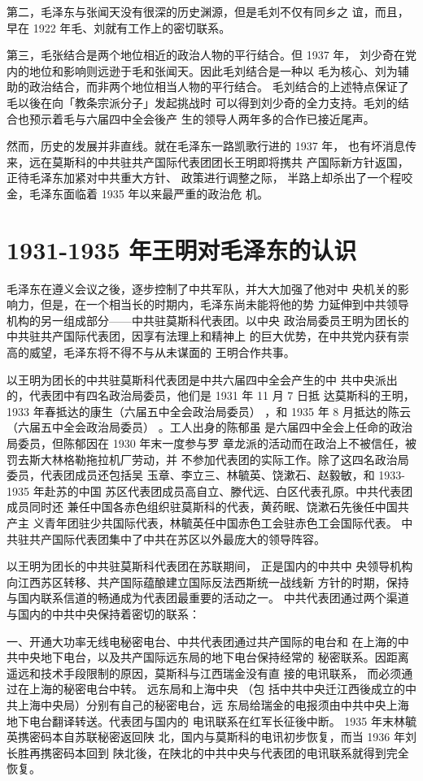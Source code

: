 第二，毛泽东与张闻天没有很深的历史渊源，但是毛刘不仅有同乡之
谊，而且，早在 1922 年毛、刘就有工作上的密切联系。

第三，毛张结合是两个地位相近的政治人物的平行结合。但 1937 年，
刘少奇在党内的地位和影响则远逊于毛和张闻天。因此毛刘结合是一种以
毛为核心、刘为辅助的政治结合，而非两个地位相当人物的平行结合。
毛刘结合的上述特点保证了毛以後在向「教条宗派分子」发起挑战时
可以得到刘少奇的全力支持。毛刘的结合也预示着毛与六届四中全会後产
生的领导人两年多的合作已接近尾声。

然而，历史的发展并非直线。就在毛泽东一路凯歌行进的 1937 年，
也有坏消息传来，远在莫斯科的中共驻共产国际代表团团长王明即将携共
产国际新方针返国，
正待毛泽东加紧对中共重大方针、
政策进行调整之际，
半路上却杀出了一个程咬金，毛泽东面临着 1935 年以来最严重的政治危
机。

\section{1931-1935 年王明对毛泽东的认识}
毛泽东在遵义会议之後，逐步控制了中共军队，并大大加强了他对中
央机关的影响力，但是，在一个相当长的时期内，毛泽东尚未能将他的势
力延伸到中共领导机构的另一组成部分——中共驻莫斯科代表团。以中央
政治局委员王明为团长的中共驻共产国际代表团，因享有法理上和精神上
的巨大优势，在中共党内获有崇高的威望，毛泽东将不得不与从未谋面的
王明合作共事。
 
以王明为团长的中共驻莫斯科代表团是中共六届四中全会产生的中
共中央派出的，代表团中有四名政治局委员，他们是 1931 年 11 月 7 日抵
达莫斯科的王明，1933 年春抵达的康生（六届五中全会政治局委员） ，和
1935 年 8 月抵达的陈云（六届五中全会政治局委员） 。工人出身的陈郁虽
是六届四中全会上任命的政治局委员，但陈郁因在 1930 年末一度参与罗
章龙派的活动而在政治上不被信任，被罚去斯大林格勒拖拉机厂劳动，并
不参加代表团的实际工作。除了这四名政治局委员，代表团成员还包括吴
玉章、李立三、林毓英、饶漱石、赵毅敏，和 1933-1935 年赴苏的中国
苏区代表团成员高自立、滕代远、白区代表孔原。中共代表团成员同时还
兼任中国各赤色组织驻莫斯科的代表，黄药眠、饶漱石先後任中国共产主
义青年团驻少共国际代表，林毓英任中国赤色工会驻赤色工会国际代表。
中共驻共产国际代表团集中了中共在苏区以外最庞大的领导阵容。

以王明为团长的中共驻莫斯科代表团在苏联期间，
正是国内的中共中
央领导机构向江西苏区转移、共产国际蕴酿建立国际反法西斯统一战线新
方针的时期，保持与国内联系信道的畅通成为代表团最重要的活动之一。
中共代表团通过两个渠道与国内的中共中央保持着密切的联系：

一、开通大功率无线电秘密电台、中共代表团通过共产国际的电台和
在上海的中共中央地下电台，以及共产国际远东局的地下电台保持经常的
秘密联系。因距离遥远和技术手段限制的原因，莫斯科与江西瑞金没有直
接的电讯联系，
而必须通过在上海的秘密电台中转。
远东局和上海中央
（包
括中共中央迁江西後成立的中共上海中央局）分别有自己的秘密电台，远
东局给瑞金的电报须由中共中央上海地下电台翻译转送。代表团与国内的
电讯联系在红军长征後中断。
1935 年末林毓英携密码本自苏联秘密返回陕
北，国内与莫斯科的电讯初步恢复，而当 1936 年刘长胜再携密码本回到
陕北後，在陕北的中共中央与代表团的电讯联系就得到完全恢复。

